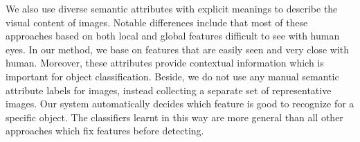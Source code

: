 We also use diverse semantic attributes with explicit meanings to
describe the visual content of images. Notable differences include
that most of these approaches based on both local and global features
difficult to see with human eyes. In our method, we base on features
that are easily seen and very close with human. Moreover, these
attributes provide contextual information which is important for 
object classification. Beside, we do not use any manual semantic
attribute labels for images, instead collecting a separate set of
representative images. Our system automatically decides which
feature is good to recognize for a specific object. The classifiers
learnt in this way are more general than all other approaches which
fix features before detecting.







